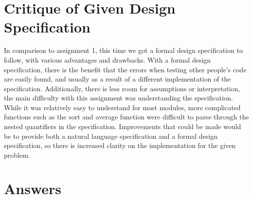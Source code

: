 \documentclass[12pt]{article}
\begin{document}
\newpage

\section{Critique of Given Design Specification}

In comparison to assignment 1, this time we got a formal design specification to follow, with various advantages and drawbacks. With a formal design specification, there is the benefit that the errors when testing other people's code are easily found, and usually as a result of a different implementation of the specification. Additionally, there is less room for assumptions or interpretation, the main difficulty with this assignment was understanding the specification. While it was relatively easy to understand for most modules, more complicated functions such as the sort and average function were difficult to parse through the nested quantifiers in the specification. Improvements that could be made would be to provide both a natural language specification and a formal design specification, so there is increased clarity on the implementation for the given problem.

\section{Answers}
\end{document}
